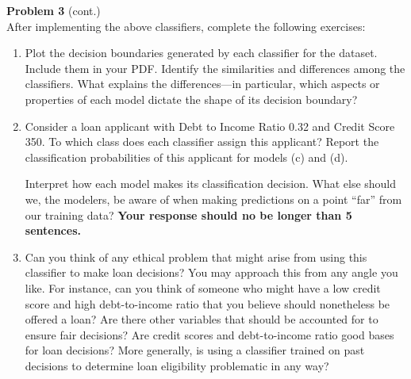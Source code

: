 \documentclass[submit]{../harvardml}
\begin{document}
\begin{framed}
  \noindent\textbf{Problem 3} (cont.)\\

After implementing the above classifiers, complete the following exercises:
  \begin{enumerate}



      \item Plot the decision boundaries generated by each classifier for the dataset. Include them in your PDF.
            Identify the similarities and differences among the classifiers. What explains the differences---in particular, which aspects or properties of each model dictate the shape of its decision boundary?
    
      \item
    
            Consider a loan applicant with Debt to Income Ratio 0.32 and Credit Score 350. To which class does each classifier assign this applicant? Report the classification probabilities of this applicant for models (c) and (d).
            
            Interpret how each model makes its classification decision. What else should we, the modelers, be aware of when making predictions on a point “far” from our training data? \textbf{Your response should no be longer than 5 sentences.}

    \item
        Can you think of any ethical problem that might arise from using this classifier to make loan decisions? You may approach this from any angle you like. For instance, can you think of someone who might have a low credit score and high debt-to-income ratio that you believe should nonetheless be offered a loan? Are there other variables that should be accounted for to ensure fair decisions? Are credit scores and debt-to-income ratio good bases for loan decisions? More generally, is using a classifier trained on past decisions to determine loan eligibility problematic in any way?
    \end{enumerate}
\end{framed}

\newpage
\end{document}
